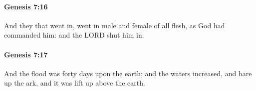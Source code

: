 		\paragraph{Genesis 7:16} %
			\label{GENESIS-7-16}

			And they that went in, went in male and female of all flesh, as God had commanded him: and the LORD shut him in.


		\paragraph{Genesis 7:17} %
			\label{GENESIS-7-17}

			And the flood was forty days upon the earth; and the waters increased, and bare up the ark, and it was lift up above the earth.


